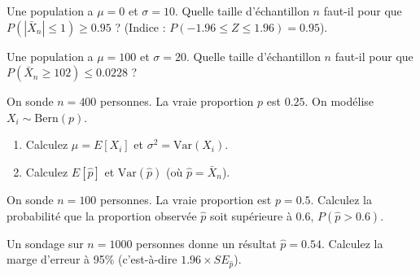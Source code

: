 \begin{exercicebox}
Une population a $\mu=0$ et $\sigma=10$.
Quelle taille d'échantillon $n$ faut-il pour que $P(|\bar{X}_n| \le 1) \ge 0.95$ ?
(Indice : $P(-1.96 \le Z \le 1.96) = 0.95$).
\end{exercicebox}

\begin{exercicebox}
Une population a $\mu=100$ et $\sigma=20$.
Quelle taille d'échantillon $n$ faut-il pour que $P(\bar{X}_n \ge 102) \le 0.0228$ ?
\end{exercicebox}


\begin{exercicebox}
On sonde $n=400$ personnes. La vraie proportion $p$ est $0.25$. On modélise $X_i \sim \text{Bern}(p)$.
\begin{enumerate}
    \item Calculez $\mu = E[X_i]$ et $\sigma^2 = \text{Var}(X_i)$.
    \item Calculez $E[\hat{p}]$ et $\text{Var}(\hat{p})$ (où $\hat{p} = \bar{X}_n$).
\end{enumerate}
\end{exercicebox}

\begin{exercicebox}
On sonde $n=100$ personnes. La vraie proportion est $p=0.5$.
Calculez la probabilité que la proportion observée $\hat{p}$ soit supérieure à 0.6, $P(\hat{p} > 0.6)$.
\end{exercicebox}

\begin{exercicebox}
Un sondage sur $n=1000$ personnes donne un résultat $\hat{p} = 0.54$.
Calculez la marge d'erreur à 95\% (c'est-à-dire $1.96 \times SE_{\hat{p}}$).
\end{exercicebox}